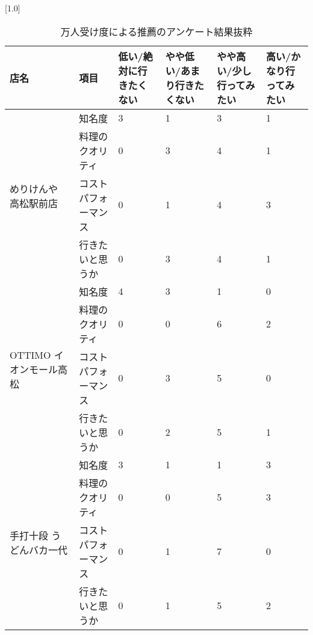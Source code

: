 \begin{table}[H]
\centering
\caption{万人受け度による推薦のアンケート結果抜粋}
\label{table:questionnaire:acceptability}
\small
\scalebox{0.7}[1.0]{
\begin{tabular}{|l|l|l|l|l|l|}
\hline
店名 & 項目 & 低い/絶対に行きたくない & やや低い/あまり行きたくない & やや高い/少し行ってみたい & 高い/かなり行ってみたい \\ \hline
\multirow{4}{*}{めりけんや 高松駅前店} & 知名度 & 3 & 1 & 3 & 1 \\ \cline{2-6}
 & 料理のクオリティ & 0 & 3 & 4 & 1 \\ \cline{2-6}
 & コストパフォーマンス & 0 & 1 & 4 & 3 \\ \cline{2-6}
 & 行きたいと思うか & 0 & 3 & 4 & 1 \\ \hline
\multirow{4}{*}{OTTIMO イオンモール高松} & 知名度 & 4 & 3 & 1 & 0 \\ \cline{2-6}
 & 料理のクオリティ & 0 & 0 & 6 & 2 \\ \cline{2-6}
 & コストパフォーマンス & 0 & 3 & 5 & 0 \\ \cline{2-6}
 & 行きたいと思うか & 0 & 2 & 5 & 1 \\ \hline
\multirow{4}{*}{手打十段 うどんバカ一代} & 知名度 & 3 & 1 & 1 & 3 \\ \cline{2-6}
 & 料理のクオリティ & 0 & 0 & 5 & 3 \\ \cline{2-6}
 & コストパフォーマンス & 0 & 1 & 7 & 0 \\ \cline{2-6}
 & 行きたいと思うか & 0 & 1 & 5 & 2 \\ \hline
\end{tabular}
}
\end{table}
